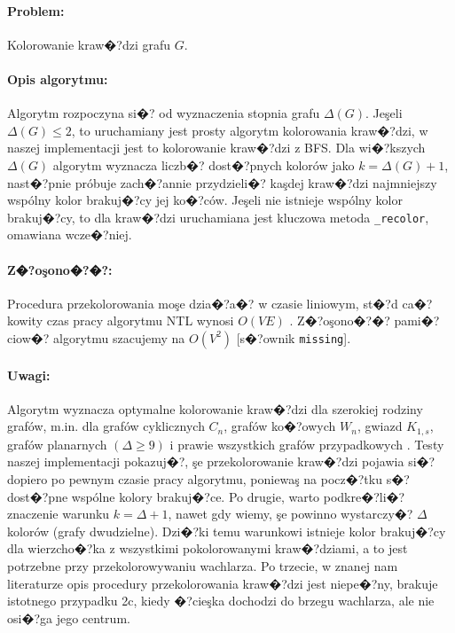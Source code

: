 \documentclass[12pt,a4paper]{mwrep}
\begin{document}
\paragraph{Problem:} Kolorowanie kraw�?dzi grafu $G$.

\paragraph{Opis algorytmu:} Algorytm rozpoczyna si�? od wyznaczenia
stopnia grafu $\Delta(G)$. Jeşeli $\Delta(G) \le 2$, to uruchamiany jest
prosty algorytm kolorowania kraw�?dzi, w naszej implementacji jest to
kolorowanie kraw�?dzi z BFS.
Dla wi�?kszych $\Delta(G)$ algorytm wyznacza liczb�? dost�?pnych kolorów
jako $k = \Delta(G) + 1$, nast�?pnie próbuje zach�?annie przydzieli�?
kaşdej kraw�?dzi najmniejszy wspólny kolor brakuj�?cy jej ko�?ców.
Jeşeli nie istnieje wspólny kolor brakuj�?cy, to dla kraw�?dzi
uruchamiana jest kluczowa metoda \lstinline|_recolor|,
omawiana wcze�?niej.

\paragraph{Z�?oşono�?�?:} Procedura przekolorowania moşe dzia�?a�? w czasie
liniowym, st�?d ca�?kowity czas pracy algorytmu NTL wynosi $O(V E)$
\cite{Kubale}.
Z�?oşono�?�? pami�?ciow�? algorytmu szacujemy na $O(V^2)$
[s�?ownik \lstinline|missing|].

\paragraph{Uwagi:} Algorytm wyznacza optymalne kolorowanie kraw�?dzi
dla szerokiej rodziny grafów, m.in. dla grafów cyklicznych $C_n$,
grafów ko�?owych $W_n$, gwiazd $K_{1,s}$, grafów planarnych $(\Delta \ge 9)$
i prawie wszystkich grafów przypadkowych
\cite{Kubale}.
Testy naszej implementacji pokazuj�?, şe przekolorowanie kraw�?dzi
pojawia si�? dopiero po pewnym czasie pracy algorytmu, poniewaş
na pocz�?tku s�? dost�?pne wspólne kolory brakuj�?ce.
Po drugie, warto podkre�?li�? znaczenie warunku $k=\Delta+1$,
nawet gdy wiemy, şe powinno wystarczy�? $\Delta$ kolorów
(grafy dwudzielne). Dzi�?ki temu warunkowi istnieje kolor
brakuj�?cy dla wierzcho�?ka z wszystkimi pokolorowanymi kraw�?dziami,
a to jest potrzebne przy przekolorowywaniu wachlarza.
Po trzecie, w znanej nam literaturze opis procedury przekolorowania
kraw�?dzi jest niepe�?ny, brakuje istotnego przypadku 2c,
kiedy �?cieşka dochodzi do brzegu wachlarza, ale nie osi�?ga
jego centrum.
\end{document}
